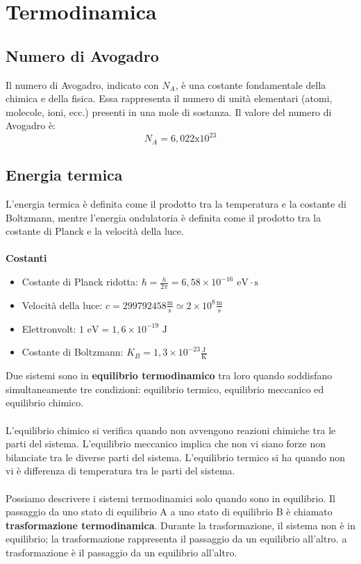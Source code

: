 \documentclass{article}
\begin{document}
\newpage
\section{Termodinamica}
\subsection{Numero di Avogadro}
Il numero di Avogadro, indicato con \(N_A\), è una costante fondamentale della chimica e della fisica. Essa rappresenta il numero di unità elementari (atomi, molecole, ioni, ecc.) presenti in una mole di sostanza. Il valore del numero di Avogadro è:
\[
    N_A = 6,022 \text{x} 10^{23}
\]
\subsection{Energia termica}
L'energia termica è definita come il prodotto tra la temperatura e la costante di Boltzmann, mentre l'energia ondulatoria è definita come il prodotto tra la costante di Planck e la velocità della luce.\\
\\
\textbf{Costanti}
\begin{itemize}
    \item Costante di Planck ridotta: \(\hbar = \frac{h}{2\pi} = 6,58 \times 10^{-16} \text{ eV} \cdot \text{s} \)
    \item Velocità della luce: \( c = 299792458 \frac{\text{m}}{\text{s}} \simeq 2 \times 10^8 \frac{\text{m}}{\text{s}}  \)
    \item Elettronvolt: \( 1 \text{ eV} = 1,6 \times 10^{-19} \text{ J} \)
    \item Costante di Boltzmann: \( K_B = 1,3 \times 10^{-23} \frac{\text{J}}{\text{K}} \)
\end{itemize}
Due sistemi sono in \textbf{equilibrio termodinamico} tra loro quando soddisfano simultaneamente tre condizioni: equilibrio termico, equilibrio meccanico ed equilibrio chimico.\\
\\
L’equilibrio chimico si verifica quando non avvengono reazioni chimiche tra le parti del sistema. L’equilibrio meccanico implica che non vi siano forze non bilanciate tra le diverse parti del sistema. L’equilibrio termico si ha quando non vi è differenza di temperatura tra le parti del sistema.\\
\\
Possiamo descrivere i sistemi termodinamici solo quando sono in equilibrio. Il passaggio da uno stato di equilibrio A a uno stato di equilibrio B è chiamato \textbf{trasformazione termodinamica}. Durante la trasformazione, il sistema non è in equilibrio; la trasformazione rappresenta il passaggio da un equilibrio all'altro.
a trasformazione è il passaggio da un equilibrio all’altro.
\newpage
\end{document}
